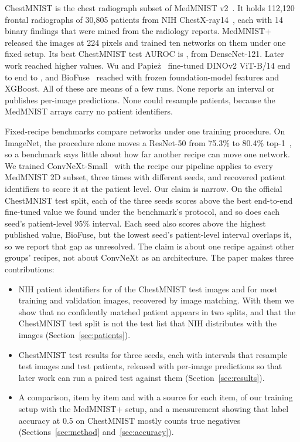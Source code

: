 \documentclass[conference]{IEEEtran}
\newif\ifanycitation
\let\citeAnyKey\cite
\renewcommand{\cite}{\global\anycitationtrue\citeAnyKey}
\begin{document}
ChestMNIST is the chest radiograph subset of MedMNIST v2~\cite{yang2023medmnist}. It
holds 112,120 frontal radiographs of 30,805 patients from NIH
ChestX-ray14~\cite{wang2017chestxray8}, each with 14 binary findings that were mined from
the radiology reports. MedMNIST+~\cite{doerrich2025medmnistplus} released the images at
224 pixels and trained ten networks on them under one fixed setup. Its best ChestMNIST
test AUROC is \basePlusAuroc{}, from DenseNet-121. Later work reached higher values. Wu
and Papie\.{z}~\cite{wu2025rethinking} fine-tuned DINOv2 ViT-B/14 end to end to
\baseWuAuroc{}, and BioFuse~\cite{hossain2026biofuse} reached \baseBestAuroc{} with
frozen foundation-model features and XGBoost. All of these are means of a few runs. None
reports an interval or publishes per-image predictions. None could resample patients,
because the MedMNIST arrays carry no patient identifiers.

Fixed-recipe benchmarks compare networks under one training procedure. On ImageNet, the
procedure alone moves a ResNet-50 from 75.3\% to 80.4\% top-1~\cite{wightman2021resnet}, so
a benchmark says little about how far another recipe can move one network. We trained
ConvNeXt-Small~\cite{liu2022convnext} with the recipe our pipeline applies to every
MedMNIST 2D subset, three times with different seeds, and recovered patient identifiers to
score it at the patient level. Our claim is narrow. On the official ChestMNIST test split,
each of the three seeds scores above the best end-to-end fine-tuned value we found under
the benchmark's protocol, and so does each seed's patient-level 95\% interval. Each seed
also scores above the highest published value, BioFuse, but the lowest seed's
patient-level interval overlaps it, so we report that gap as unresolved. The claim is about one recipe against other groups'
recipes, not about ConvNeXt as an architecture. The paper makes three contributions:
\begin{itemize}
\item NIH patient identifiers for \confidentTest{} of the \rowsTest{} ChestMNIST test
images and for most training and validation images, recovered by image matching. With
them we show that no confidently matched patient appears in two splits, and that the
ChestMNIST test split is not the test list that NIH distributes with the images
(Section~\ref{sec:patients}).
\item ChestMNIST test results for three seeds, each with intervals that resample test
images and test patients, released with per-image predictions so that later work can run
a paired test against them (Section~\ref{sec:results}).
\item A comparison, item by item and with a source for each item, of our training setup
with the MedMNIST+ setup, and a measurement showing that label accuracy at 0.5 on
ChestMNIST mostly counts true negatives (Sections~\ref{sec:method} and~\ref{sec:accuracy}).
\end{itemize}
\end{document}
